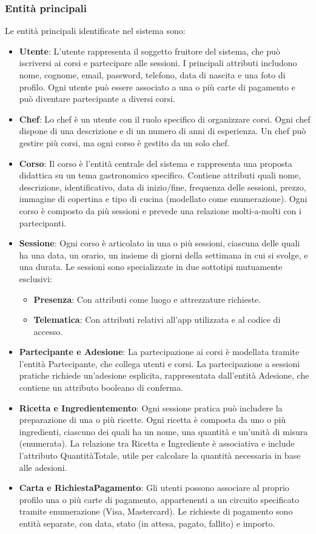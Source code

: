 \subsubsection{Entità principali}
Le entità principali identificate nel sistema sono:
\begin{itemize}
    \item \textbf{Utente}: L’utente rappresenta il soggetto fruitore del sistema, che può iscriversi ai corsi e partecipare alle sessioni. I principali attributi includono nome, cognome, email, password, telefono, data di nascita e una foto di profilo. Ogni utente può essere associato a una o più carte di pagamento e può diventare partecipante a diversi corsi.
    \item \textbf{Chef}: Lo chef è un utente con il ruolo specifico di organizzare corsi. Ogni chef dispone di una descrizione e di un numero di anni di esperienza. Un chef può gestire più corsi, ma ogni corso è gestito da un solo chef.
    \item \textbf{Corso}: Il corso è l'entità centrale del sistema e rappresenta una proposta didattica su un tema gastronomico specifico. Contiene attributi quali nome, descrizione, identificativo, data di inizio/fine, frequenza delle sessioni, prezzo, immagine di copertina e tipo di cucina (modellato come enumerazione). Ogni corso è composto da più sessioni e prevede una relazione molti-a-molti con i partecipanti.
    \item \textbf{Sessione}: Ogni corso è articolato in una o più sessioni, ciascuna delle quali ha una data, un orario, un insieme di giorni della settimana in cui si svolge, e una durata. Le sessioni sono specializzate in due sottotipi mutuamente esclusivi:
    \begin{itemize}
        \item \textbf{Presenza}: Con attributi come luogo e attrezzature richieste.
        \item \textbf{Telematica}: Con attributi relativi all'app utilizzata e al codice di accesso.
    \end{itemize}
    \item \textbf{Partecipante e Adesione}: La partecipazione ai corsi è modellata tramite l’entità Partecipante, che collega utenti e corsi. La partecipazione a sessioni pratiche richiede un’adesione esplicita, rappresentata dall'entità Adesione, che contiene un attributo booleano di conferma.
    \item \textbf{Ricetta e Ingredientemento}: Ogni sessione pratica può includere la preparazione di una o più ricette. Ogni ricetta è composta da uno o più ingredienti, ciascuno dei quali ha un nome, una quantità e un'unità di misura (enumerata). La relazione tra Ricetta e Ingrediente è associativa e include l'attributo QuantitàTotale, utile per calcolare la quantità necessaria in base alle adesioni.
    \item \textbf{Carta e RichiestaPagamento}: Gli utenti possono associare al proprio profilo una o più carte di pagamento, appartenenti a un circuito specificato tramite enumerazione (Visa, Mastercard). Le richieste di pagamento sono entità separate, con data, stato (in attesa, pagato, fallito) e importo.
\end{itemize}
